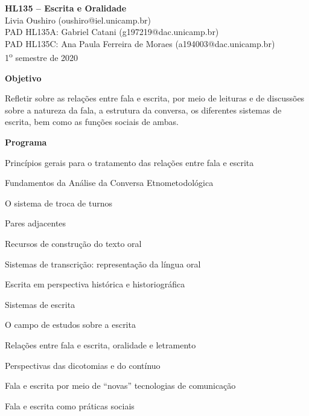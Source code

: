 \documentclass[a4paper,12pt]{article}
\newcommand{\n}{\noindent}
\begin{document}
{


\begin{center}
	{\Large \textbf{HL135 -- Escrita e Oralidade}}\\
	Livia Oushiro (oushiro@iel.unicamp.br)\\
	PAD HL135A: Gabriel Catani (g197219@dac.unicamp.br) \\
	PAD HL135C: Ana Paula Ferreira de Moraes (a194003@dac.unicamp.br)\\
	1\textsuperscript{o} semestre de 2020
\end{center}

\n \textbf{Objetivo} \bigskip

\n Refletir sobre as relações entre fala e escrita, por meio de leituras e de discussões sobre a natureza da fala, a estrutura da conversa, os diferentes sistemas de escrita, bem como as funções sociais de ambas.  

\bigskip

\n  \textbf{Programa} \bigskip
\begin{compactenum}
	\item Princípios gerais para o tratamento das relações entre fala e escrita 
	\item Fundamentos da Análise da Conversa Etnometodológica
		\begin{compactenum}
			\item O sistema de troca de turnos
			\item Pares adjacentes
			\item Recursos de construção do texto oral
		\end{compactenum}
	\item Sistemas de transcrição: representação da língua oral 
	\item Escrita em perspectiva histórica e historiográfica
		\begin{compactenum}
			\item Sistemas de escrita
			\item O campo de estudos sobre a escrita
		\end{compactenum}
	\item Relações entre fala e escrita, oralidade e letramento
		\begin{compactenum}
			\item Perspectivas das dicotomias e do contínuo
			\item Fala e escrita por meio de ``novas'' tecnologias de comunicação
			\item Fala e escrita como práticas sociais
		\end{compactenum}
\end{compactenum}

}
\end{document}
